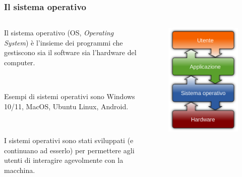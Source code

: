 \documentclass[handout]{beamer}
\begin{document}
\begin{frame}
\frametitle{Il sistema operativo}
\begin{columns}
  \begin{column}{.65\textwidth}
    Il sistema operativo (OS, \emph{Operating System}) è l'\alert<1>{insieme dei programmi che gestiscono sia il software sia l'hardware del computer}.\pause

    ~
    
    Esempi di sistemi operativi sono Windows 10/11, MacOS, Ubuntu Linux, Android.\pause
    
    ~
    
    I sistemi operativi sono stati sviluppati (e continuano ad esserlo) per permettere agli utenti di \alert<3>{interagire agevolmente con la macchina}.
  \end{column}
  \begin{column}{.3\textwidth}
      \begin{figure}
        \includegraphics[width=\columnwidth]{img/sistemaoperativo.png}
      \end{figure}
  \end{column}
\end{columns}
\end{frame}
\end{document}
